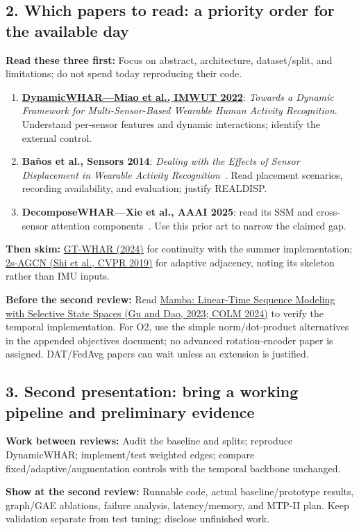 \documentclass[10pt]{article}
\begin{document}
\subsection*{2. Which papers to read: a priority order for the available day}
\textbf{Read these three first:} Focus on abstract, architecture, dataset/split, and limitations; do not spend today reproducing their code.
\begin{enumerate}[itemsep=2pt]
\item \href{https://github.com/wdkhuans/DynamicWHAR}{\textbf{DynamicWHAR---Miao et al., IMWUT 2022}}: \emph{Towards a Dynamic Framework for Multi-Sensor-Based Wearable Human Activity Recognition}. Understand per-sensor features and dynamic interactions; identify the external control.
\item \textbf{Ba\~nos et al., Sensors 2014}: \emph{Dealing with the Effects of Sensor Displacement in Wearable Activity Recognition}~\cite{banos}. Read placement scenarios, recording availability, and evaluation; justify REALDISP.
\item \textbf{DecomposeWHAR---Xie et al., AAAI 2025}: read its SSM and cross-sensor attention components~\cite{decompose}. Use this prior art to narrow the claimed gap.
\end{enumerate}
\textbf{Then skim:} \href{https://doi.org/10.1109/TETCI.2024.3378331}{GT-WHAR (2024)} for continuity with the summer implementation; \href{https://arxiv.org/abs/1805.07694}{2s-AGCN (Shi et al., CVPR 2019)} for adaptive adjacency, noting its skeleton rather than IMU inputs.

\textbf{Before the second review:} Read \href{https://arxiv.org/abs/2312.00752}{Mamba: Linear-Time Sequence Modeling with Selective State Spaces (Gu and Dao, 2023; COLM 2024)} to verify the temporal implementation. For O2, use the simple norm/dot-product alternatives in the appended objectives document; no advanced rotation-encoder paper is assigned. DAT/FedAvg papers can wait unless an extension is justified.

\subsection*{3. Second presentation: bring a working pipeline and preliminary evidence}
\textbf{Work between reviews:} Audit the baseline and splits; reproduce DynamicWHAR; implement/test weighted edges; compare fixed/adaptive/augmentation controls with the temporal backbone unchanged.

\textbf{Show at the second review:} Runnable code, actual baseline/prototype results, graph/GAE ablations, failure analysis, latency/memory, and MTP-II plan. Keep validation separate from test tuning; disclose unfinished work.

\clearpage
\begingroup
\newcommand{\roadmapobjectivesembedded}{}

\endgroup
\end{document}
